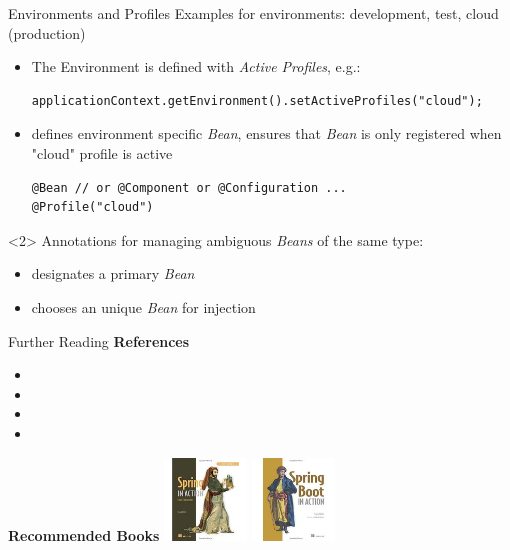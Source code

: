 \begin{frame}[fragile]{Environments and Profiles}
Examples for environments: development, test, cloud (production)
\begin{itemize}
\item The Environment is defined with \textit{Active Profiles}, e.g.:
\begin{lstlisting}
applicationContext.getEnvironment().setActiveProfiles("cloud");
\end{lstlisting}
\item {} defines environment specific \emph{Bean}, ensures that \emph{Bean} is only registered when "cloud" profile is active
\begin{lstlisting}
@Bean // or @Component or @Configuration ...
@Profile("cloud")
\end{lstlisting}
\end{itemize}
\vfill
\begin{visibleenv}<2>
Annotations for managing ambiguous \emph{Beans} of the same type:
\begin{itemize}
\item {} designates a primary \emph{Bean}
\item {} chooses an unique \emph{Bean} for injection
\end{itemize}
\end{visibleenv}
\end{frame}

\begin{frame}{Further Reading}
\textbf{References}
\begin{itemize}
\item {}
\item {}
\item {}
\item {}
\end{itemize}
\vfill
\textbf{Recommended Books}\newline\newline
\includegraphics[height=22mm]{../SpringBasics/images/SpringInAction}  
\includegraphics[height=22mm]{../SpringBoot/images/SpringBootInAction}
\end{frame}
